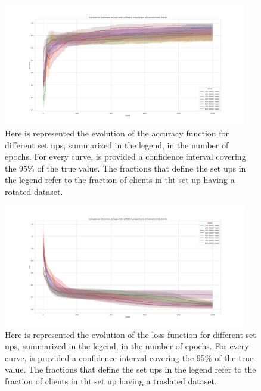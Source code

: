 \documentclass{article} %
\newcounter{late}
\begin{document}
\begin{figure}[!hb]
    \centering
        \includegraphics[width=0.95\textwidth, keepaspectratio]{images/accuracy_red_TL2.png}
    \caption{Here is represented the evolution of the accuracy function for different set ups, 
    summarized in the legend, in the number of epochs. For every curve, is provided a confidence 
    interval covering the 95\% of the true value. The fractions that define the set ups in the 
    legend refer to the fraction of clients in tht set up having a rotated dataset.}
    \label{fig9}
\end{figure}
\newpage
\begin{figure}[!ht]
    \centering
        \includegraphics[width=0.95\textwidth, keepaspectratio]{images/loss_red_TL1.png}    
    \caption{Here is represented the evolution of the loss function for different set ups, 
    summarized in the legend, in the number of epochs. For every curve, is provided a confidence 
    interval covering the 95\% of the true value. The fractions that define the set ups in the 
    legend refer to the fraction of clients in tht set up having a traslated dataset.}
    \label{fig10}
\end{figure}
\end{document}
